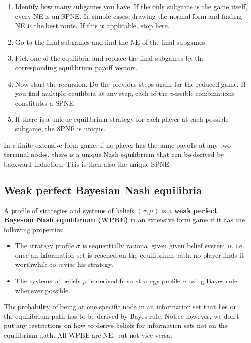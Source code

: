 \documentclass[10pt]{article}
\begin{document}
\begin{spacing}{1.0}
\begin{enumerate}
\item Identify how many subgames you have. If the only subgame is the game
  itself, every NE is an SPNE. In simple cases, drawing the normal form and
  finding NE is the best route. If this is applicable, stop here.
\item Go to the final subgames and find the NE of the final subgames.
\item Pick one of the equilibria and replace the final subgames by the
  corresponding equilibrium payoff vectors.
\item Now start the recursion. Do the previous steps again for the reduced
  game. If you find multiple equilibria at any step, each of the possible
  combinations constitutes a SPNE.
\item If there is a unique equilibrium strategy for each player at each
  possible subgame, the SPNE is unique.
\end{enumerate}

\begin{lemma}
  In a finite extensive form game, if no player has the same payoffs at any
  two terminal nodes, there is a unique Nash equilibrium that can be
  derived by backward induction. This is then also the unique SPNE.
\end{lemma}

\subsection{Weak perfect Bayesian Nash equilibria}

\begin{definition}
  A profile of strategies and systems of beliefs $(\sigma, \mu)$ is a
  \textbf{weak perfect Bayesian Nash equilibrium (WPBE)} in an extensive
  form game if it has the following properties:
  \begin{itemize}
  \item The strategy profile $\sigma$ is sequentially rational given given
    belief system $\mu$, i.e. once an information set is reached on the
    equilibrium path, no player finds it worthwhile to revise his strategy.
  \item The systems of beliefs $\mu$ is derived from strategy profile
    $\sigma$ using Bayes rule whenever possible.
  \end{itemize}
\end{definition}

The probability of being at one specific node in an information set that
lies on the equilibrium path has to be derived by Bayes rule. Notice
however, we don't put any restrictions on how to derive beliefs for
information sets not on the equilibrium path. All WPBE are NE, but not vice versa.


\end{spacing}
\end{document}
